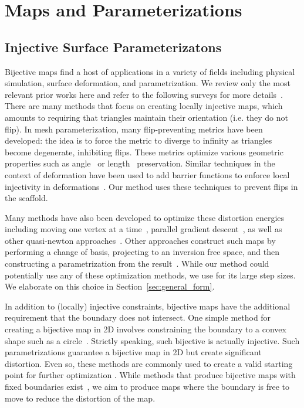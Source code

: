 \section{Maps and Parameterizations}

\subsection*{Injective Surface Parameterizatons}
Bijective maps find a host of applications in a variety of fields including physical simulation, surface deformation, and parametrization.  We review only the most relevant prior works here and refer to the following surveys for more details~\cite{FloaterSurvey:2005,Sheffer:2006,Hormann:2007}.
 There are many methods that focus on creating {locally} injective maps, which amounts to requiring that triangles maintain their orientation (i.e. they do not flip). In mesh parameterization, many flip-preventing metrics have been developed: the idea is to force the metric to diverge to infinity as triangles become degenerate, inhibiting flips.  These metrics optimize various geometric properties such as angle~\cite{hormann2000mips,Degener:2003} or length~\cite{Sander:2001,Sorkine:2002,Aigerman:2014,Poranne:2014,Smith:2015} preservation.  Similar techniques in the context of deformation have been used to add barrier functions to enforce local injectivity in deformations~\cite{Schuller:2013}. Our method uses these techniques to prevent flips in the scaffold.

Many methods have also been developed to optimize these distortion energies including moving one vertex at a time~\cite{hormann2000mips}, parallel gradient descent~\cite{fu2015computing}, as well as other quasi-newton approaches~\cite{Smith:2015,Kovalsky:2016,rabinovich2017scalable}.  Other approaches construct such maps by performing a change of basis, projecting to an inversion free space, and then constructing a parametrization from the result~\cite{Fu:2016}. While our method could potentially use any of these optimization methods, we use \cite{rabinovich2017scalable} for its large step sizes. We elaborate on this choice in Section~\ref{sec:general_form}.

In addition to (locally) injective constraints, bijective maps have the additional requirement that the boundary does not intersect.  One simple method for creating a bijective map in 2D involves constraining the boundary to a convex shape such as a circle~\cite{Tutte:1963,Floater:97}. Strictly speaking, such bijective is actually injective.  
Such parametrizations guarantee a bijective map in 2D but create significant distortion.  Even so, these methods are commonly used to create a valid starting point for further optimization \cite{Schuller:2013,Smith:2015,rabinovich2017scalable}. 
While methods that produce bijective maps with fixed boundaries exist~\cite{Weber:2014:LIP,Campen:2016}, we aim to produce maps where the boundary is free to move to reduce the distortion of the map.

